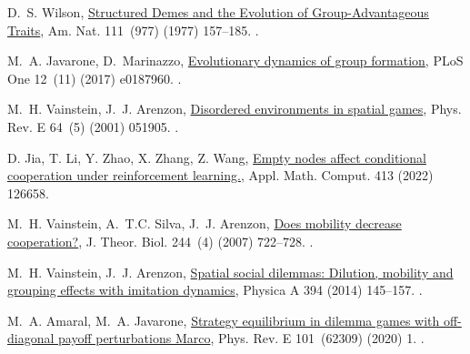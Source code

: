 \documentclass[5p,review]{elsarticle}
\begin{document}
\begin{thebibliography}{10}
D.~S. Wilson,
  \href{http://www.journals.uchicago.edu/doi/10.1086/283146}{{Structured Demes and the Evolution of Group-Advantageous Traits}}, Am. Nat. 111~(977) (1977)
  157--185.
\newblock \href {http://dx.doi.org/10.1086/283146} {}.

M.~A. Javarone, D.~Marinazzo,
  \href{https://dx.plos.org/10.1371/journal.pone.0187960}{{Evolutionary
  dynamics of group formation}}, PLoS One 12~(11) (2017) e0187960.
\newblock \href {http://dx.doi.org/10.1371/journal.pone.0187960}
  {}.

M.~H. Vainstein, J.~J. Arenzon,
  \href{http://link.aps.org/doi/10.1103/PhysRevE.64.051905
  https://link.aps.org/doi/10.1103/PhysRevE.64.051905}{{Disordered environments
  in spatial games}}, Phys. Rev. E 64~(5) (2001) 051905.
\newblock \href {http://dx.doi.org/10.1103/PhysRevE.64.051905}
  {}.

D. Jia, T. Li, Y. Zhao, X. Zhang, Z. Wang,
\href{https://doi.org/10.1016/j.amc.2021.126658}{{Empty nodes affect conditional cooperation under reinforcement learning.}}, Appl. Math. Comput. 413 (2022) 126658.
\newblock \href {https://doi.org/10.1016/j.amc.2021.126658}{}

M.~H. Vainstein, A.~{T.C. Silva}, J.~J. Arenzon,
  \href{http://linkinghub.elsevier.com/retrieve/pii/S0022519306004218}{{Does
  mobility decrease cooperation?}}, J. Theor. Biol. 244~(4) (2007) 722--728.
\newblock \href {http://dx.doi.org/10.1016/j.jtbi.2006.09.012}
  {}.

M.~H. Vainstein, J.~J. Arenzon,
  \href{http://linkinghub.elsevier.com/retrieve/pii/S0378437113009096
  https://linkinghub.elsevier.com/retrieve/pii/S0378437113009096}{{Spatial
  social dilemmas: Dilution, mobility and grouping effects with imitation
  dynamics}}, Physica A 394 (2014) 145--157.
\newblock \href{http://dx.doi.org/10.1016/j.physa.2013.09.032}
  {}.

M.~A. Amaral, M.~A. Javarone,
  \href{https://doi.org/10.1103/PhysRevE.101.062309}{{Strategy equilibrium in
  dilemma games with off-diagonal payoff perturbations Marco}}, Phys. Rev. E
  101~(62309) (2020) 1.
\newblock \href {http://dx.doi.org/10.1103/PhysRevE.101.062309}
  {}.


\end{thebibliography}
\end{document}
